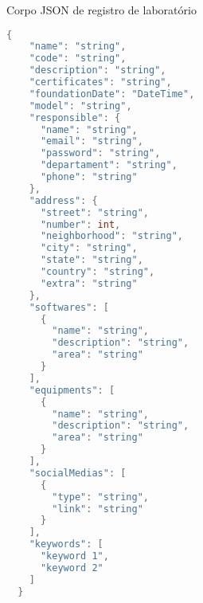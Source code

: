 \begin{sourcecode}[H]
    \caption{\label{codigo:register-lab}Corpo JSON de registro de laboratório}
    \begin{lstlisting}[frame=single, language=Java]
  {
    "name": "string",
    "code": "string",
    "description": "string",
    "certificates": "string",
    "foundationDate": "DateTime",
    "model": "string",
    "responsible": {
      "name": "string",
      "email": "string",
      "password": "string",
      "departament": "string",
      "phone": "string"
    },
    "address": {
      "street": "string",
      "number": int,
      "neighborhood": "string",
      "city": "string",
      "state": "string",
      "country": "string",
      "extra": "string"
    },
    "softwares": [
      {
        "name": "string",
        "description": "string",
        "area": "string"
      }
    ],
    "equipments": [
      {
        "name": "string",
        "description": "string",
        "area": "string"
      }
    ],
    "socialMedias": [
      {
        "type": "string",
        "link": "string"
      }
    ],
    "keywords": [
      "keyword 1",
      "keyword 2"
    ]
  }
  \end{lstlisting}
    \fonte{}
  \end{sourcecode}
